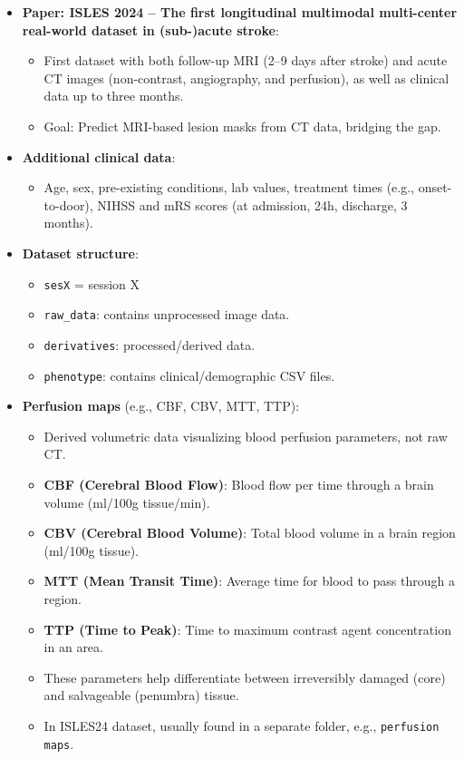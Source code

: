 \documentclass[a4paper,12pt]{article}
\begin{document}
\begin{itemize}
    \item \textbf{Paper: ISLES 2024 – The first longitudinal multimodal multi-center real-world dataset in (sub-)acute stroke}:
    \begin{itemize}
        \item First dataset with both follow-up MRI (2–9 days after stroke) and acute CT images (non-contrast, angiography, and perfusion), as well as clinical data up to three months.
        \item Goal: Predict MRI-based lesion masks from CT data, bridging the gap.
    \end{itemize}

    \item \textbf{Additional clinical data}:
    \begin{itemize}
        \item Age, sex, pre-existing conditions, lab values, treatment times (e.g., onset-to-door), NIHSS and mRS scores (at admission, 24h, discharge, 3 months).
    \end{itemize}

    \item \textbf{Dataset structure}:
    \begin{itemize}
        \item \texttt{sesX} = session X
        \item \texttt{raw\_data}: contains unprocessed image data.
        \item \texttt{derivatives}: processed/derived data.
        \item \texttt{phenotype}: contains clinical/demographic CSV files.
    \end{itemize}

    \item \textbf{Perfusion maps} (e.g., CBF, CBV, MTT, TTP):
    \begin{itemize}
        \item Derived volumetric data visualizing blood perfusion parameters, not raw CT.
        \item \textbf{CBF (Cerebral Blood Flow)}: Blood flow per time through a brain volume (ml/100g tissue/min).
        \item \textbf{CBV (Cerebral Blood Volume)}: Total blood volume in a brain region (ml/100g tissue).
        \item \textbf{MTT (Mean Transit Time)}: Average time for blood to pass through a region.
        \item \textbf{TTP (Time to Peak)}: Time to maximum contrast agent concentration in an area.
        \item These parameters help differentiate between irreversibly damaged (core) and salvageable (penumbra) tissue.
        \item In ISLES24 dataset, usually found in a separate folder, e.g., \texttt{perfusion maps}.
    \end{itemize}


\end{itemize}
\end{document}

